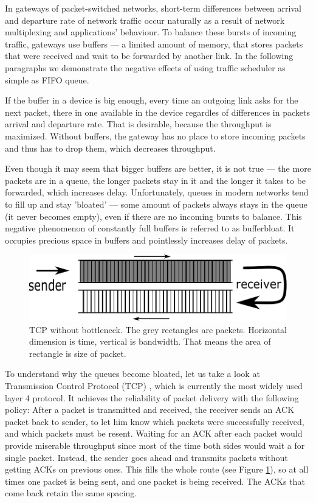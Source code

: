 In gateways of packet-switched networks, short-term differences between arrival and departure rate of network traffic occur naturally as a result of network multiplexing and applications' behaviour. To balance these bursts of incoming traffic, gateways use buffers --- a limited amount of memory, that stores packets that were received and wait to be forwarded by another link. In the following paragraphs we demonstrate the negative effects of using traffic scheduler as simple as FIFO queue.


If the buffer in a device is big enough, every time an outgoing link asks for the next packet, there in one available in the device regardles of differences in packets arrival and departure rate. That is desirable, because the throughput is maximized. Without buffers, the gateway has no place to store incoming packets and thus has to drop them, which decreases throughput.

Even though it may seem that bigger buffers are better, it is not true --- the more packets are in a queue, the longer packets stay in it and the longer it takes to be forwarded, which increases delay. Unfortunately, queues in modern networks tend to fill up and stay 'bloated' \cite{Gettys:2012:BDB:2063176.2063196} --- some amount of packets always stays in the queue (it never becomes empty), even if there are no incoming bursts to balance. This negative phenomenon of constantly full buffers is referred to as bufferbloat. It occupies precious space in buffers and pointlessly increases delay of packets.

\begin{figure}
	\centering
	\includegraphics[width=137mm]{drawings/tcp_no_bottleneck}
	\caption{TCP without bottleneck. The grey rectangles are packets. Horizontal dimension is time, vertical is bandwidth. That means the area of rectangle is size of packet.}
	\label{fig01:no_bottle}
\end{figure}

To understand why the queues become bloated, let us take a look at Transmission Control Protocol (TCP) \cite{rfc793}, which is currently the most widely used layer 4 protocol. It achieves the reliability of packet delivery with the following policy: After a packet is transmitted and received, the receiver sends an ACK packet back to sender, to let him know which packets were successfully received, and which packets must be resent. Waiting for an ACK after each packet would provide miserable throughput since most of the time both sides would wait a for single packet. Instead, the sender goes ahead and transmits packets without getting ACKs on previous ones. This fills the whole route (see Figure \ref{fig01:no_bottle}), so at all times one packet is being sent, and one packet is being received. The ACKs that come back retain the same spacing.

